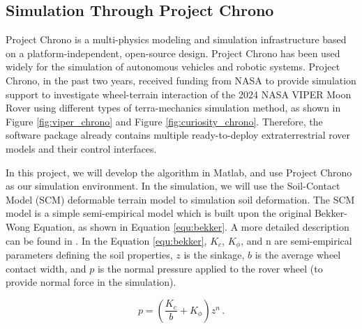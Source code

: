 \documentclass{article}
\begin{document}
\subsection{Simulation Through Project Chrono}
\label{subsec:chrono}
Project Chrono is a multi-physics modeling and simulation infrastructure based on a platform-independent, open-source design. Project Chrono has been used widely for the simulation of autonomous vehicles and robotic systems. Project Chrono, in the past two years, received funding from NASA to provide simulation support to investigate wheel-terrain interaction of the 2024 NASA VIPER Moon Rover using different types of terra-mechanics simulation method, as shown in Figure \ref{fig:viper_chrono} and Figure \ref{fig:curiosity_chrono}. Therefore, the software package already contains multiple ready-to-deploy extraterrestrial rover models and their control interfaces. 

In this project, we will develop the algorithm in Matlab, and use Project Chrono as our simulation environment. In the simulation, we will use the Soil-Contact Model (SCM) deformable terrain model to simulation soil deformation. The SCM model is a simple semi-empirical model which is built upon the original Bekker-Wong Equation, as shown in Equation \ref{equ:bekker}. A more detailed description can be found in \cite{10.1115/1.4056851}. In the Equation \ref{equ:bekker}, \(K_{c}\), \(K_{\phi}\), and n are semi-empirical parameters defining the soil properties, \(z\) is the sinkage, \(b\) is the average wheel contact width, and \(p\) is the normal pressure applied to the rover wheel (to provide normal force in the simulation).

\begin{equation}\label{equ:bekker}
	p = \left( \frac{K_c}{b} + K_\phi \right) z^n \, .
\end{equation}
\end{document}
